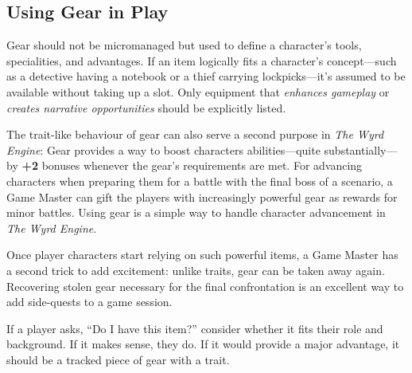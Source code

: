 \subsection{Using Gear in Play}
Gear should not be micromanaged but used to define a character’s tools, specialities, and advantages. If an item logically fits a character’s concept—such as a detective having a notebook or a thief carrying lockpicks—it’s assumed to be available without taking up a slot. Only equipment that \emph{enhances gameplay} or \emph{creates narrative opportunities} should be explicitly listed.

The trait-like behaviour of gear can also serve a second purpose in \emph{The Wyrd Engine}: Gear provides a way to boost characters abilities---quite substantially---by \textbf{+2} bonuses whenever the gear's requirements are met. For advancing characters when preparing them for a battle with the final boss of a scenario, a Game Master can gift the players with increasingly powerful gear as rewards for minor battles. Using gear is a simple way to handle character advancement in \emph{The Wyrd Engine}.

Once player characters start relying on such powerful items, a Game Master has a second trick to add excitement: unlike traits, gear can be taken away again. Recovering stolen gear necessary for the final confrontation is an excellent way to add side-quests to a game session.

\begin{GmTips}
	If a player asks, “Do I have this item?” consider whether it fits their role and background. If it makes sense, they do. If it would provide a major advantage, it should be a tracked piece of gear with a trait.
\end{GmTips}

